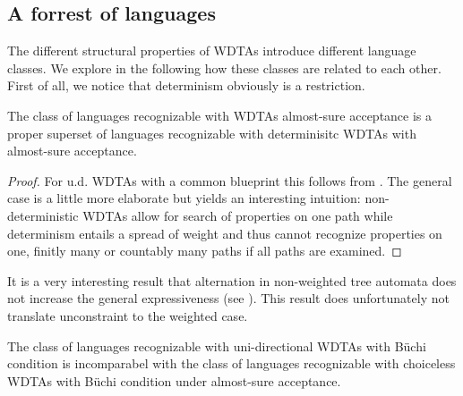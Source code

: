 \subsection{A forrest of languages}
The different structural properties of \acp{WDTA} introduce different language
classes. We explore in the following how these classes are related to each
other. First of all, we notice that determinism obviously is a restriction.
\begin{proposition}
  The class of languages recognizable with \acp{WDTA} almost-sure acceptance
  is a proper superset of languages recognizable with determinisitc \acp{WDTA}
  with almost-sure acceptance.
\end{proposition}
\begin{proof}
  For u.d. \acp{WDTA} with a common blueprint this follows from
  \cite[Proposition 10]{RandAutoInfTrees}.
  The general case is a little more elaborate but yields an interesting
  intuition: non-deterministic \acp{WDTA} allow for search of properties on
  one path while determinism entails a spread of weight and thus cannot
  recognize properties on one, finitly many or countably many paths if all
  paths are examined. 
\end{proof}
It is a very interesting result that alternation in non-weighted tree automata
does not increase the general expressiveness (see \cite{MullerSchupp}).
This result does unfortunately not translate unconstraint to the weighted case.
\begin{proposition}
  The class of languages recognizable with uni-directional \acp{WDTA} with
  Büchi condition is incomparabel with the class of languages recognizable with
  choiceless \acp{WDTA} with Büchi condition under almost-sure acceptance.
\end{proposition}
